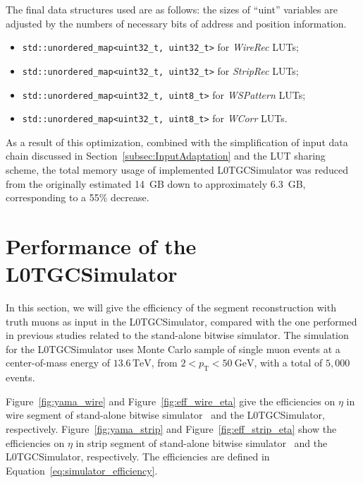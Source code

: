 The final data structures used are as follows: the sizes of ``uint'' variables are adjusted by the numbers of necessary bits of address and position information.
\begin{itemize}
  \item \texttt{std::unordered\_map<uint32\_t, uint32\_t>} for \textit{WireRec} LUTs;
  \item \texttt{std::unordered\_map<uint32\_t, uint32\_t>} for \textit{StripRec} LUTs;
  \item \texttt{std::unordered\_map<uint32\_t, uint8\_t>}  for \textit{WSPattern} LUTs;
  \item \texttt{std::unordered\_map<uint32\_t, uint8\_t>}  for \textit{WCorr} LUTs.
\end{itemize}

As a result of this optimization, combined with the simplification of input data chain discussed in Section~\ref{subsec:InputAdaptation} and the LUT sharing scheme, the total memory usage of implemented L0TGCSimulator was reduced from the originally estimated 14~GB down to approximately 6.3~GB, corresponding to a 55\% decrease.

\section{Performance of the L0TGCSimulator} \label{sec:L0MuonS1TGCPerformance}
In this section, we will give the efficiency of the segment reconstruction with truth muons as input in the L0TGCSimulator, compared with the one performed in previous studies related to the stand-alone bitwise simulator. The simulation for the L0TGCSimulator uses Monte Carlo sample of single muon events at a center-of-mass energy of $13.6\,\mathrm{TeV}$, from $2 < p_\mathrm{T} < 50~\text{GeV}$, with a total of $5{,}000$ events.

Figure~\ref{fig:yama_wire} and Figure~\ref{fig:eff_wire_eta} give the efficiencies on $\eta$ in wire segment of stand-alone bitwise simulator~\cite{yamashita} and the L0TGCSimulator, respectively. Figure~\ref{fig:yama_strip} and Figure~\ref{fig:eff_strip_eta} show the efficiencies on $\eta$ in strip segment of stand-alone bitwise simulator~\cite{yamashita} and the L0TGCSimulator, respectively. The efficiencies are defined in Equation~\ref{eq:simulator_efficiency}. 

